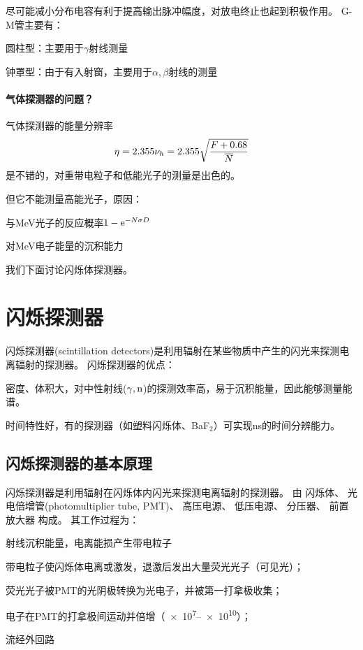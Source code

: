 尽可能减小分布电容有利于提高输出脉冲幅度，对放电终止也起到积极作用。
G-M管主要有：
\begin{compactenum}
	\item 圆柱型：主要用于$\gamma$射线测量
	\item 钟罩型：由于有入射窗，主要用于$\alpha,\beta$射线的测量
\end{compactenum}
\newpage
\paragraph{气体探测器的问题？}气体探测器的能量分辨率
\[
	\eta=2.355\nu_h=2.355\sqrt{\frac{F+0.68}{\overline N}}
\]
是不错的，对重带电粒子和低能光子的测量是出色的。

但它不能测量高能光子，原因：
\begin{compactenum}
	\item 与MeV光子的反应概率$1-\mathop{}\!\mathrm{e}^{-N\sigma D}$
	\item 对MeV电子能量的沉积能力
\end{compactenum}
我们下面讨论闪烁体探测器。
\clearpage
\section{闪烁探测器}
闪烁探测器(scintillation detectors)是利用辐射在某些物质中产生的闪光来探测电离辐射的探测器。
闪烁探测器的优点：
\begin{compactenum}
	\item 密度、体积大，对中性射线($\gamma,\mathrm n$)的探测效率高，易于沉积能量，因此能够测量能谱。
	\item 时间特性好，有的探测器（如塑料闪烁体、BaF$_2$）可实现ns的时间分辨能力。
\end{compactenum}
\subsection{闪烁探测器的基本原理}
闪烁探测器是利用辐射在闪烁体内闪光来探测电离辐射的探测器。
由
闪烁体、
光电倍增管(photomultiplier tube, PMT)、
高压电源、
低压电源、
分压器、
前置放大器
构成。
其工作过程为：
\begin{compactenum}
	\item 射线沉积能量，电离能损产生带电粒子
	\item 带电粒子使闪烁体电离或激发，退激后发出大量荧光光子（可见光）；
	\item 荧光光子被PMT的光阴极转换为光电子，并被第一打拿极收集；
	\item 电子在PMT的打拿极间运动并倍增（\numrange{e7}{e10}）；
	\item 流经外回路
\end{compactenum}
